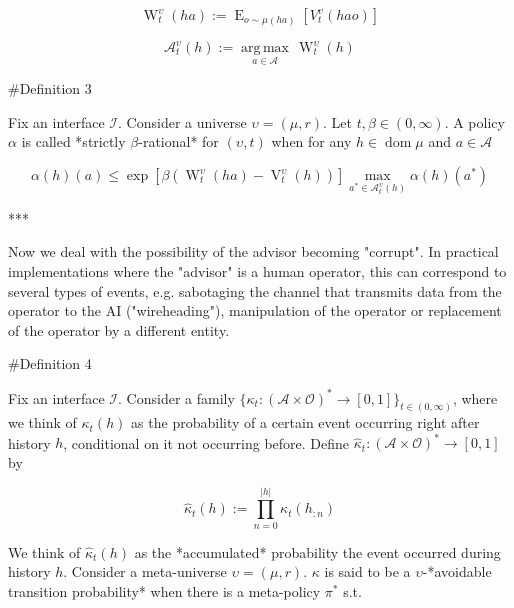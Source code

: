 \documentclass[a4paper]{article}
\DeclareMathOperator{\Dom}{dom}
\DeclareMathOperator{\E}{E}
\newcommand{\Argmax}[1]{\underset{#1}{\operatorname{arg\,max}}\,}
\newcommand{\Abs}[1]{\lvert #1 \rvert}
\newcommand{\Ob}{\mathcal{O}}
\newcommand{\A}{\mathcal{A}}
\newcommand{\I}{\mathcal{I}}
\newcommand{\FH}{(\A \times \Ob)^*}
\newcommand{\V}{\operatorname{V}}
\newcommand{\W}{\operatorname{W}}
\begin{document}
$$\W_t^\upsilon(ha):=\E_{o \sim \mu(ha)}[V_t^\upsilon(hao)]$$

$$\A^\upsilon_t(h) := \Argmax{a \in \A} \W_t^\upsilon(h)$$

\#Definition 3

Fix an interface $\I$. Consider a universe $\upsilon=(\mu,r)$. Let $t,\beta \in (0,\infty)$. A policy $\alpha$ is called *strictly $\beta$-rational* for $(\upsilon,t)$ when for any $h \in \Dom{\mu}$ and $a \in \A$

$$\alpha(h)(a) \leq \exp{[\beta(\W^{\upsilon}_t(ha)-\V^\upsilon_t(h))]} \max_{a^* \in \A^\upsilon_t(h)} \alpha(h)(a^*)$$

***

Now we deal with the possibility of the advisor becoming "corrupt". In practical implementations where the "advisor" is a human operator, this can correspond to several types of events, e.g. sabotaging the channel that transmits data from the operator to the AI ("wireheading"), manipulation of the operator or replacement of the operator by a different entity.

\#Definition 4

Fix an interface $\I$. Consider a family $\{\kappa_t: \FH \rightarrow [0,1]\}_{t \in (0,\infty)}$, where we think of $\kappa_t(h)$ as the probability of a certain event occurring right after history $h$, conditional on it not occurring before. Define $\hat{\kappa}_t: \FH \rightarrow [0,1]$ by

$$\hat{\kappa}_t(h):= \prod_{n = 0}^{\Abs{h}} \kappa_t(h_{:n})$$

We think of $\hat{\kappa}_t(h)$ as the *accumulated* probability the event occurred during history $h$. Consider a meta-universe $\upsilon=(\mu,r)$. $\kappa$ is said to be a $\upsilon$-*avoidable transition probability* when there is a meta-policy $\pi^*$ s.t.
\end{document}
